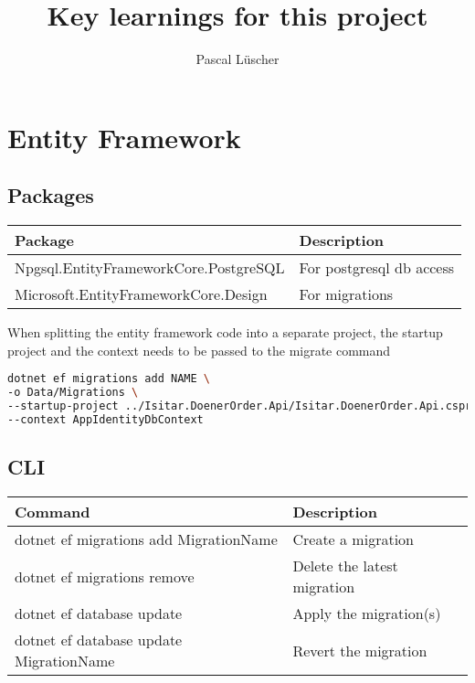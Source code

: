 \documentclass[12pt, a4paper]{article}
\begin{document}
\title{Key learnings for this project}
\author{Pascal Lüscher}

\maketitle
\thispagestyle{empty}
\tableofcontents{}

\section{Entity Framework}

\subsection{Packages}
\begin{table}
\centering
	\begin{tabular}{|l l|}
		\hline
		Package & Description \\
		\hline \hline
		Npgsql.EntityFrameworkCore.PostgreSQL & For postgresql db access \\
		
		Microsoft.EntityFrameworkCore.Design & For migrations \\
		\hline
	\end{tabular}
\end{table}

When splitting the entity framework code into a separate project, the startup project and the context needs to be passed to the migrate command

\begin{lstlisting}[language=bash]
dotnet ef migrations add NAME \
-o Data/Migrations \
--startup-project ../Isitar.DoenerOrder.Api/Isitar.DoenerOrder.Api.csproj \
--context AppIdentityDbContext
\end{lstlisting}

\subsection{CLI}

\begin{table}
\centering
	\begin{tabular}{|l l|}
		\hline
		Command & Description \\
		\hline \hline
		dotnet ef migrations add MigrationName & Create a migration \\
		dotnet ef migrations remove & Delete the latest migration \\
		\hline
		dotnet ef database update & Apply the migration(s) \\
		dotnet ef database update MigrationName & Revert the migration \\
		\hline
	\end{tabular}
\end{table}
\end{document}
